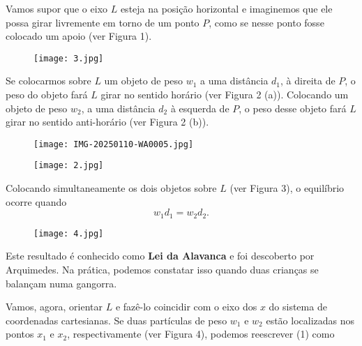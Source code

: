 \documentclass[12pt,a4paper]{report}
\begin{document}
Vamos supor que o eixo $L$ esteja na posição horizontal e imaginemos que ele possa girar livremente em torno de um ponto $P$, como se nesse ponto fosse colocado um apoio (ver Figura 1).

\begin{figure}[H]
    \centering
    \texttt{[image: 3.jpg]} %
    \caption{}
    \label{fig:ce}
\end{figure}

Se colocarmos sobre $L$ um objeto de peso $w_1$ a uma distância $d_1$, à direita de $P$, o peso do objeto fará $L$ girar no sentido horário (ver Figura 2 (a)). Colocando um objeto de peso $w_2$, a uma distância $d_2$ à esquerda de $P$, o peso desse objeto fará $L$ girar no sentido anti-horário (ver Figura 2 (b)).

\begin{figure}[h]
    \centering
    \begin{minipage}{0.45\textwidth}
        \centering
        \texttt{[image: IMG-20250110-WA0005.jpg]}
        \subcaption{}
    \end{minipage}
    \hfill
    \begin{minipage}{0.45\textwidth}
        \centering
        \texttt{[image: 2.jpg]}
        \subcaption{}
    \end{minipage}
    \caption{}
\end{figure}
Colocando simultaneamente os dois objetos sobre $L$ (ver Figura 3), o equilíbrio ocorre quando
\begin{equation}
w_1 d_1 = w_2 d_2.
\end{equation}

\begin{figure}[H]
    \centering
    \texttt{[image: 4.jpg]} %
    \caption{}
    \label{fig:ce}
\end{figure}

Este resultado é conhecido como \textbf{Lei da Alavanca} e foi descoberto por Arquimedes. Na prática, podemos constatar isso quando duas crianças se balançam numa gangorra.

Vamos, agora, orientar $L$ e fazê-lo coincidir com o eixo dos $x$ do sistema de coordenadas cartesianas. Se duas partículas de peso $w_1$ e $w_2$ estão localizadas nos pontos $x_1$ e $x_2$, respectivamente (ver Figura 4), podemos reescrever (1) como
\end{document}
